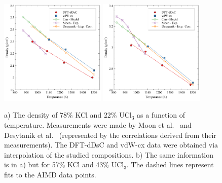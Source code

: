 \documentclass[preprint,3p,10pt,number,sort&compress]{elsarticle}
\begin{document}
\begin{figure}[h!]
\centering
\includegraphics[width=0.45\textwidth]{ben_fig5a.pdf} \includegraphics[width=0.45\textwidth]{ben_fig5b.pdf}
\caption{a) The density of 78\% KCl and 22\% UCl$_3$ as a function of temperature. Measurements were made by Moon et al.~\cite{Moon} and Desytanik et al.~\cite{DesyatnikKCl} (represented by the correlations derived from their measurements). The DFT-dDsC and vdW-cx data were obtained via interpolation of the studied compositions. b) The same information is in a) but for 57\% KCl and 43\% UCl$_3$. The dashed lines represent fits to the AIMD data points.}
\label{fig:neutron}
\end{figure}

\end{document}
